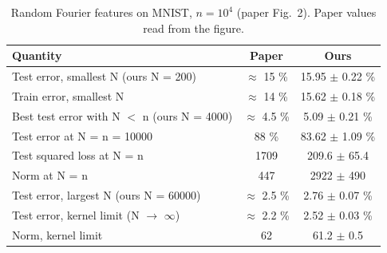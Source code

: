 \begin{table}[h]
  \centering
  \caption{Random Fourier features on MNIST, $n = 10^4$ (paper Fig.~2). Paper values read from the figure.}
  \begin{tabular}{lcc}
    \toprule
    Quantity & Paper & Ours \\
    \midrule
    Test error, smallest N (ours N = 200) & $\approx$ 15 \% & 15.95 $\pm$ 0.22 \% \\
    Train error, smallest N & $\approx$ 14 \% & 15.62 $\pm$ 0.18 \% \\
    Best test error with N $<$ n (ours N = 4000) & $\approx$ 4.5 \% & 5.09 $\pm$ 0.21 \% \\
    Test error at N = n = 10000 & 88 \% & 83.62 $\pm$ 1.09 \% \\
    Test squared loss at N = n & 1709 & 209.6 $\pm$ 65.4 \\
    Norm at N = n & 447 & 2922 $\pm$ 490 \\
    Test error, largest N (ours N = 60000) & $\approx$ 2.5 \% & 2.76 $\pm$ 0.07 \% \\
    Test error, kernel limit (N $\to$ $\infty$) & $\approx$ 2.2 \% & 2.52 $\pm$ 0.03 \% \\
    Norm, kernel limit & 62 & 61.2 $\pm$ 0.5 \\
    \bottomrule
  \end{tabular}
\end{table}
